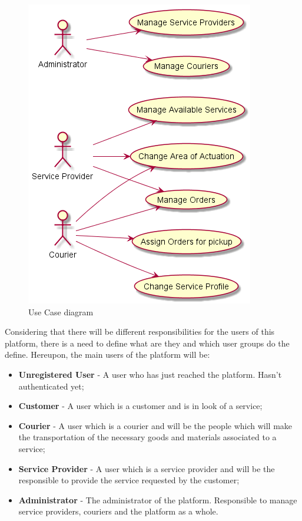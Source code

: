 \begin{figure}[ht]
\begin{minipage}{.5\textwidth}
  \includegraphics[width=\linewidth]{chapters/Requirements_Engineering/assets/BackOfficeUseCaseDiagram.png}
\end{minipage}
\caption[Use Case Diagram]{Use Case diagram}
\label{fig:useCaseDiagram}
\end{figure}

\par

Considering that there will be different responsibilities for the users of this platform, there is a need to define what are they and which user groups do the define. Hereupon, the main users of the platform will be:

\begin{itemize}
    \item \textbf{Unregistered User} - A user who has just reached the platform. Hasn't authenticated yet;
    \item \textbf{Customer} - A user which is a customer and is in look of a service;
    \item \textbf{Courier} - A user which is a courier and will be the people which will make the transportation of the necessary goods and materials associated to a service;
    \item \textbf{Service Provider} - A user which is a service provider and will be the responsible to provide the service requested by the customer;
    \item \textbf{Administrator} - The administrator of the platform. Responsible to manage service providers, couriers and the platform as a whole. 
\end{itemize}
\par


